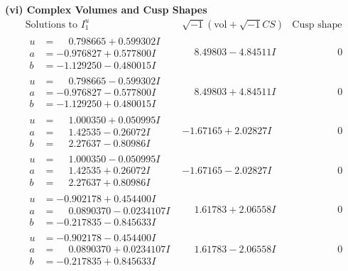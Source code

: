 \documentclass[1p]{elsarticle_modified}
\theoremstyle{definition}
\newcommand{\I}{\sqrt{-1}}
\begin{document}
\newpage\flushleft \textbf{(vi) Complex Volumes and Cusp Shapes}
$$\begin{array}{c|c|c}  
\text{Solutions to }I^u_{1}& \I (\text{vol} + \sqrt{-1}CS) & \text{Cusp shape}\\
 \hline 
\begin{aligned}
u &= \phantom{-}0.798665 + 0.599302 I \\
a &= -0.976827 + 0.577800 I \\
b &= -1.129250 - 0.480015 I\end{aligned}
 & \phantom{-}8.49803 - 4.84511 I & \phantom{-0.000000 } 0 \\ \hline\begin{aligned}
u &= \phantom{-}0.798665 - 0.599302 I \\
a &= -0.976827 - 0.577800 I \\
b &= -1.129250 + 0.480015 I\end{aligned}
 & \phantom{-}8.49803 + 4.84511 I & \phantom{-0.000000 } 0 \\ \hline\begin{aligned}
u &= \phantom{-}1.000350 + 0.050995 I \\
a &= \phantom{-}1.42535 - 0.26072 I \\
b &= \phantom{-}2.27637 - 0.80986 I\end{aligned}
 & -1.67165 + 2.02827 I & \phantom{-0.000000 } 0 \\ \hline\begin{aligned}
u &= \phantom{-}1.000350 - 0.050995 I \\
a &= \phantom{-}1.42535 + 0.26072 I \\
b &= \phantom{-}2.27637 + 0.80986 I\end{aligned}
 & -1.67165 - 2.02827 I & \phantom{-0.000000 } 0 \\ \hline\begin{aligned}
u &= -0.902178 + 0.454400 I \\
a &= \phantom{-}0.0890370 - 0.0234107 I \\
b &= -0.217835 - 0.845633 I\end{aligned}
 & \phantom{-}1.61783 + 2.06558 I & \phantom{-0.000000 } 0 \\ \hline\begin{aligned}
u &= -0.902178 - 0.454400 I \\
a &= \phantom{-}0.0890370 + 0.0234107 I \\
b &= -0.217835 + 0.845633 I\end{aligned}
 & \phantom{-}1.61783 - 2.06558 I & \phantom{-0.000000 } 0 \\ \hline\begin{aligned}

\end{aligned}
\end{array}$$
\end{document}
